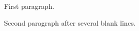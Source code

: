 \documentclass{article}
\begin{document}
First paragraph.



Second paragraph after several blank lines.
\end{document}

